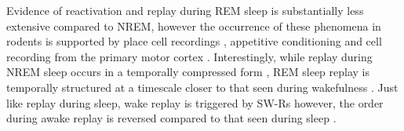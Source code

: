 Evidence of reactivation and replay during REM sleep is substantially less extensive compared to NREM, however the occurrence of these phenomena in rodents is supported by place cell recordings \parencite{louie_temporally_2001,poe_experience-dependent_2000}, appetitive conditioning \parencite{maho_appetitive_2002} and cell recording from the primary motor cortex \parencite{eckert_neural_2020}.
Interestingly, while replay during NREM sleep occurs in a temporally compressed form \parencite{lee_memory_2002}, REM sleep replay is temporally structured at a timescale closer to that seen during wakefulness \parencite{louie_temporally_2001}. Just like replay during sleep, wake replay is triggered by SW-Rs however, the order during awake replay is reversed compared to that seen during sleep  \parencite{foster_reverse_2006}. 





